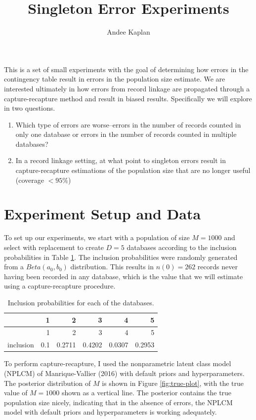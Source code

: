 \documentclass[]{article}
\title{Singleton Error Experiments}
\author{Andee Kaplan}
\date{}
\providecommand{\tightlist}{%
  \setlength{\itemsep}{0pt}\setlength{\parskip}{0pt}}
\begin{document}
\maketitle

This is a set of small experiments with the goal of determining how
errors in the contingency table result in errors in the population size
estimate. We are interested ultimately in how errors from record linkage
are propagated through a capture-recapture method and result in biased
results. Specifically we will explore in two questions.

\begin{enumerate}
\def\labelenumi{\arabic{enumi}.}
\tightlist
\item
  Which type of errors are worse--errors in the number of records
  counted in only one database or errors in the number of records
  counted in multiple databases?
\item
  In a record linkage setting, at what point to singleton errors result
  in capture-recapture estimations of the population size that are no
  longer useful (coverage \(< 95\%\))
\end{enumerate}

\hypertarget{experiment-setup-and-data}{%
\section{Experiment Setup and Data}\label{experiment-setup-and-data}}

To set up our experiments, we start with a population of size
\(M = 1000\) and select with replacement to create \(D = 5\) databases
according to the inclusion probabilities in Table \ref{tab:inclusion}.
The inclusion probabilities were randomly generated from a
\(Beta(a_0, b_0)\) distribution. This results in \(n(0) = 262\) records
never having been recorded in any database, which is the value that we
will estimate using a capture-recapture procedure.

\begin{longtable}[]{@{}lrrrrr@{}}
\caption{\label{tab:inclusion}Inclusion probabilities for each of the
databases.}\tabularnewline
\toprule
& 1 & 2 & 3 & 4 & 5\tabularnewline
\midrule
\endfirsthead
\toprule
& 1 & 2 & 3 & 4 & 5\tabularnewline
\midrule
\endhead
inclusion & 0.1 & 0.2711 & 0.4202 & 0.0307 & 0.2953\tabularnewline
\bottomrule
\end{longtable}

To perform capture-recapture, I used the nonparametric latent class
model (NPLCM) of Manrique-Vallier (2016) with default priors and
hyperparameters. The posterior distribution of \(M\) is shown in Figure
\ref{fig:true-plot}, with the true value of \(M = 1000\) shown as a
vertical line. The posterior contains the true population size nicely,
indicating that in the absence of errors, the NPLCM model with default
priors and hyperparameters is working adequately.
\end{document}

